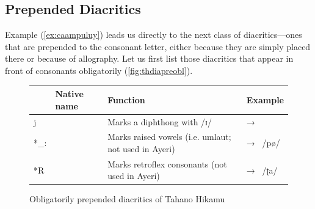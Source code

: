 \subsection{Prepended Diacritics}

Example (\ref{ex:caampuluy}) leads us directly to the next class of 
diacritics---ones that are prepended to the consonant letter, either because 
they are simply placed there or because of allography. Let us first list those 
diacritics that appear in front of consonants obligatorily 
(\autoref{fig:thdiapreobl}).

\begin{figure}[htp]
\caption{Obligatorily prepended diacritics of Tahano Hikamu}
\begin{tabu} to 
\toprule
\tableheaderfont

	& Native name
	& Function
	& Example
	\\
	
\toprule

*j
	& 
	& Marks a diphthong with /ɪ/
	&  → 
	\\
	
\midrule

*\_:
	& 
	& Marks raised vowels (i.e. umlaut; not used in Ayeri)
	&  → ~/pø/
	\\
	
\midrule

*R
	& 
	& Marks retroflex consonants (not used in Ayeri)\footnotemark
	&  → ~/ʈa/
	\\

\bottomrule
\end{tabu}
\label{fig:thdiapreobl}
\end{figure}


